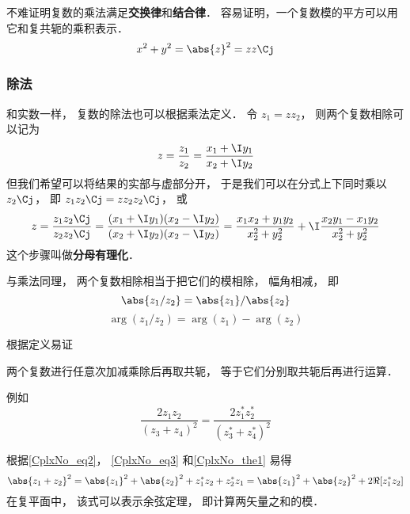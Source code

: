 不难证明复数的乘法满足\textbf{交换律}和\textbf{结合律}． 容易证明，一个复数模的平方可以用它和复共轭的乘积表示．
\begin{equation}\label{CplxNo_eq2}
x^2 + y^2 = \abs{z}^2 = z z\Cj
\end{equation}

\subsubsection{除法}
和实数一样， 复数的除法也可以根据乘法定义． 令 $z_1 = z z_2$， 则两个复数相除可以记为
\begin{equation}
z = \frac{z_1}{z_2} = \frac{x_1 + \I y_1}{x_2 + \I y_2}
\end{equation}
但我们希望可以将结果的实部与虚部分开， 于是我们可以在分式上下同时乘以 $z_2\Cj$， 即 $z_1 z_2\Cj  = z z_2 z_2\Cj$， 或
\begin{equation}
z = \frac{z_1 z_2\Cj}{z_2 z_2\Cj}
= \frac{(x_1 + \I y_1)(x_2 - \I y_2)}{(x_2 + \I y_2)(x_2 - \I y_2)}
= \frac{x_1 x_2 + y_1 y_2}{x_2^2 + y_2^2} + \I \frac{x_2 y_1 - x_1 y_2}{x_2^2 + y_2^2}
\end{equation}
这个步骤叫做\textbf{分母有理化}．

与乘法同理， 两个复数相除相当于把它们的模相除， 幅角相减， 即
\begin{equation}
\abs{z_1/z_2} = \abs{z_1}/\abs{z_2}
\end{equation}
\begin{equation}
\arg(z_1/z_2) = \arg(z_1) - \arg(z_2)
\end{equation}

根据定义易证
\begin{theorem}{}\label{CplxNo_the1}
两个复数进行任意次加减乘除后再取共轭， 等于它们分别取共轭后再进行运算．
\end{theorem}
例如
\begin{equation}
\frac{2 z_1 z_2}{(z_3 + z_4)^2} = \frac{2 z_1^* z_2^*}{(z_3^* + z_4^*)^2}
\end{equation}

根据\autoref{CplxNo_eq2}， \autoref{CplxNo_eq3} 和\autoref{CplxNo_the1} 易得
\begin{equation}
\abs{z_1 + z_2}^2 = \abs{z_1}^2 + \abs{z_2}^2 + z_1^* z_2 + z_2^* z_1 = \abs{z_1}^2 + \abs{z_2}^2 + 2\Re[z_1^* z_2]
\end{equation}
在复平面中， 该式可以表示余弦定理， 即计算两矢量之和的模．
